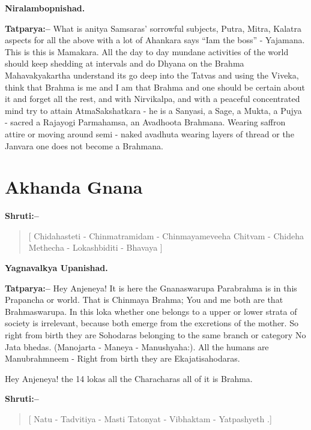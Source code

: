 \begin{flushright}
\textbf{Niralambopnishad.}
\end{flushright}

\textbf{Tatparya:–} What is anitya Samsaras' sorrowful subjects, Putra, Mitra, Kalatra aspects for all the above with a lot of Ahankara says “Iam the boss” - Yajamana. This is this is Mamakara. All the day to day mundane activities of the world should keep shedding at intervals and do Dhyana on the Brahma Mahavakyakartha understand its go deep into the Tatvas and using the Viveka, think that Brahma is me and I am that Brahma and one should be certain about it and forget all the rest, and with Nirvikalpa, and with a peaceful concentrated mind try to attain AtmaSakshatkara - he is a Sanyasi, a Sage, a Mukta, a Pujya - sacred a Rajayogi Parmahamsa, an Avadhoota Brahmana. Wearing saffron attire or moving around semi - naked avadhuta wearing layers of thread or the Janvara one does not become a Brahmana.

\chapter{Akhanda Gnana}

\textbf{Shruti:–}

\begin{verse}
[ Chidahasteti - Chinmatramidam - Chinmayame\break veeha  Chitvam - Chideha Methecha - Lokashbiditi - Bhavaya ]
\end{verse}

\begin{flushright}
\textbf{Yagnavalkya Upanishad.}
\end{flushright}

\textbf{Tatparya:–} Hey Anjeneya! It is here the Gnanaswarupa Parabrahma is in this Prapancha or world. That is Chinmaya Brahma; You and me both are that Brahmaswarupa. In this loka whether one belongs to a upper or lower strata of society is irrelevant, because both emerge from the excretions of the mother. So right from birth they are Sohodaras belonging to the same branch or category No Jata bhedas. (Manojarta - Maneya - Manushyaha:). All the humans are Manubrahmneem - Right from birth they are Ekajatisahodaras.

Hey Anjeneya! the 14 lokas all the Characharas all of it is Brahma.

\textbf{Shruti:–}

\begin{verse}
[ Natu - Tadvitiya - Masti  Tatonyat - Vibhaktam - Yatpashyeth .]
\end{verse}

